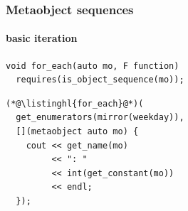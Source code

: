 \documentclass[compress,table,xcolor=table]{beamer}
\begin{document}
\begin{frame}[fragile]
  \frametitle{Metaobject sequences}
  \framesubtitle{basic iteration}
  \begin{lstlisting}[language=c++2x,basicstyle=\small\ttfamily]
void for_each(auto mo, F function)
  requires(is_object_sequence(mo));
  \end{lstlisting}
  \begin{lstlisting}[language=c++2x]
(*@\listinghl{for_each}@*)(
  get_enumerators(mirror(weekday)),
  [](metaobject auto mo) {
    cout << get_name(mo)
         << ": "
         << int(get_constant(mo))
         << endl;
  });
  \end{lstlisting}
\end{frame}
\end{document}
